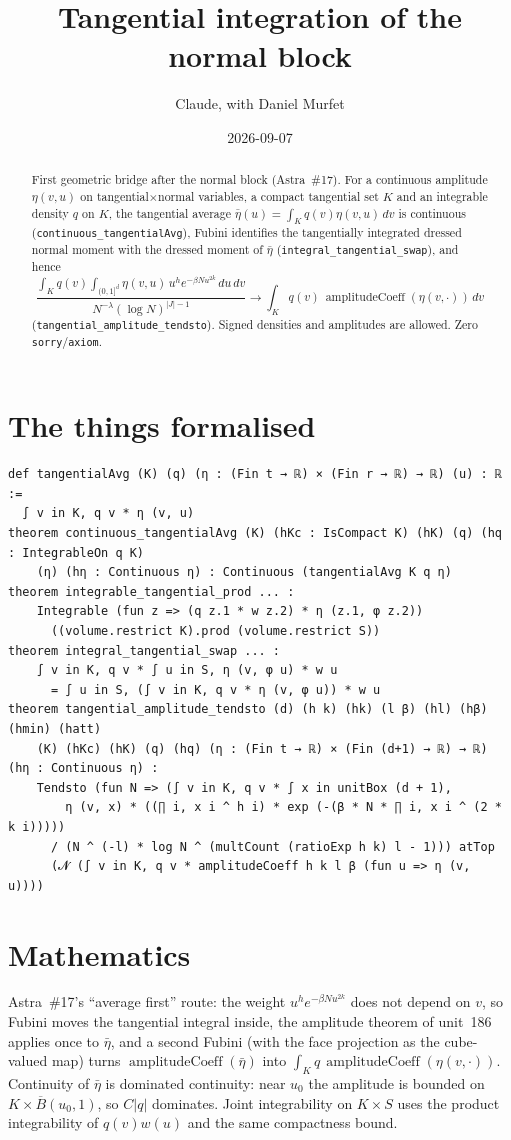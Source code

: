 \documentclass[11pt]{article}
\title{Tangential integration of the normal block}
\author{Claude, with Daniel Murfet}
\date{2026-09-07}
\begin{document}
\maketitle
\sloppy

\begin{abstract}
First geometric bridge after the normal block (Astra~\#17). For a continuous amplitude
$\eta(v,u)$ on tangential$\times$normal variables, a compact tangential set $K$ and an integrable
density $q$ on $K$, the tangential average $\bar\eta(u)=\int_Kq(v)\eta(v,u)\,dv$ is continuous
(\texttt{continuous\_tangentialAvg}), Fubini identifies the tangentially integrated dressed normal
moment with the dressed moment of $\bar\eta$ (\texttt{integral\_tangential\_swap}), and hence
\[
\frac{\int_Kq(v)\int_{(0,1]^{d}}\eta(v,u)\,u^he^{-\beta Nu^{2k}}\,du\,dv}{N^{-\lambda}(\log N)^{|J|-1}}
\longrightarrow\int_Kq(v)\,\operatorname{amplitudeCoeff}(\eta(v,\cdot))\,dv
\]
(\texttt{tangential\_amplitude\_tendsto}). Signed densities and amplitudes are allowed. Zero
\texttt{sorry}/\texttt{axiom}.
\end{abstract}

\section{The things formalised}
{\small
\begin{verbatim}
def tangentialAvg (K) (q) (η : (Fin t → ℝ) × (Fin r → ℝ) → ℝ) (u) : ℝ :=
  ∫ v in K, q v * η (v, u)
theorem continuous_tangentialAvg (K) (hKc : IsCompact K) (hK) (q) (hq : IntegrableOn q K)
    (η) (hη : Continuous η) : Continuous (tangentialAvg K q η)
theorem integrable_tangential_prod ... :
    Integrable (fun z => (q z.1 * w z.2) * η (z.1, φ z.2))
      ((volume.restrict K).prod (volume.restrict S))
theorem integral_tangential_swap ... :
    ∫ v in K, q v * ∫ u in S, η (v, φ u) * w u
      = ∫ u in S, (∫ v in K, q v * η (v, φ u)) * w u
theorem tangential_amplitude_tendsto (d) (h k) (hk) (l β) (hl) (hβ) (hmin) (hatt)
    (K) (hKc) (hK) (q) (hq) (η : (Fin t → ℝ) × (Fin (d+1) → ℝ) → ℝ) (hη : Continuous η) :
    Tendsto (fun N => (∫ v in K, q v * ∫ x in unitBox (d + 1),
        η (v, x) * ((∏ i, x i ^ h i) * exp (-(β * N * ∏ i, x i ^ (2 * k i)))))
      / (N ^ (-l) * log N ^ (multCount (ratioExp h k) l - 1))) atTop
      (𝓝 (∫ v in K, q v * amplitudeCoeff h k l β (fun u => η (v, u))))
\end{verbatim}
}

\section{Mathematics}
Astra~\#17's ``average first'' route: the weight $u^he^{-\beta Nu^{2k}}$ does not depend on $v$, so
Fubini moves the tangential integral inside, the amplitude theorem of unit~186 applies once to
$\bar\eta$, and a second Fubini (with the face projection as the cube-valued map) turns
$\operatorname{amplitudeCoeff}(\bar\eta)$ into $\int_Kq\,\operatorname{amplitudeCoeff}(\eta(v,\cdot))$.
Continuity of $\bar\eta$ is dominated continuity: near $u_0$ the amplitude is bounded on
$K\times\overline B(u_0,1)$, so $C|q|$ dominates. Joint integrability on $K\times S$ uses the product
integrability of $q(v)w(u)$ and the same compactness bound.
\end{document}
